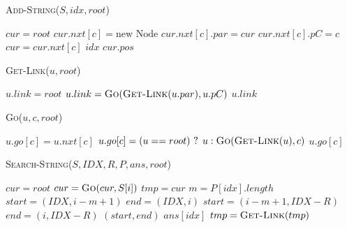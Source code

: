         \textsc{Add-String}($S, idx, root$)
        \begin{algorithmic}[1]
        \State $cur = root$
                \State $cur.nxt[c] = \text{new Node}$
                \State $cur.nxt[c].par = cur$
                \State $cur.nxt[c].pC = c$
            \EndIf
            \State $cur = cur.nxt[c]$
        \EndFor
        \State {} $idx$  $cur.pos$
        \end{algorithmic}

        \textsc{Get-Link}($u, root$)
        \begin{algorithmic}[1]
                \State $u.link = root$
            \Else
                \State $u.link = \textsc{Go}(\textsc{Get-Link}(u.par), u.pC)$
            \EndIf
        \EndIf
        \State \Return $u.link$
        \end{algorithmic}

        \textsc{Go}($u, c, root$)
        \begin{algorithmic}[1]
                \State $u.go[c] = u.nxt[c]$
            \Else
                \State $u.go[c] = (u == root) \text{ ? } u : \textsc{Go}(\textsc{Get-Link}(u), c)$
            \EndIf
        \EndIf
        \State \Return $u.go[c]$
        \end{algorithmic}

        \textsc{Search-String}($S, IDX, R, P, ans, root$)
        \begin{algorithmic}[1]
        \State $cur = root$
            \State $cur = \textsc{Go}(cur, S[i])$
            \State $tmp = cur$
                    \State $m = P[idx].length$
                        \State $start = (IDX, i - m + 1)$
                        \State $end = (IDX, i)$
                    \Else 
                        \State $start = (i - m + 1, IDX - R)$
                        \State $end = (i, IDX - R)$
                    \EndIf
                    \State {} $(start, end)$  $ans[idx]$
                \EndFor
                \State $tmp = \textsc{Get-Link}(tmp)$
            \EndWhile
        \EndFor
        \end{algorithmic}

